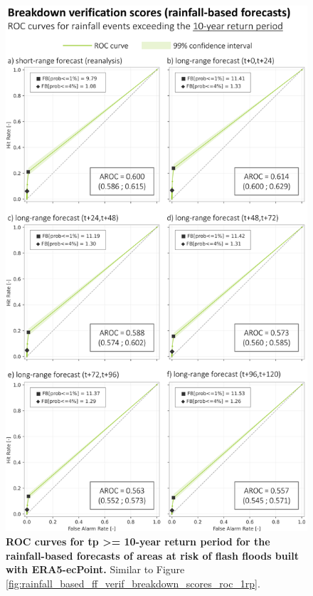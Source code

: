 \begin{figure}[htbp]
\centering
\includegraphics[width=\textwidth]{chapter_05/figures/rainfall_based_ff_verif_breakdown_scores_roc_10rp.png}
\caption{\textbf{ROC curves for tp >= 10-year return period for the rainfall-based forecasts of areas at risk of flash floods built with ERA5-ecPoint.} Similar to Figure \ref{fig:rainfall_based_ff_verif_breakdown_scores_roc_1rp}.}
\label{fig:rainfall_based_ff_verif_breakdown_scores_roc_10rp}
\end{figure}

